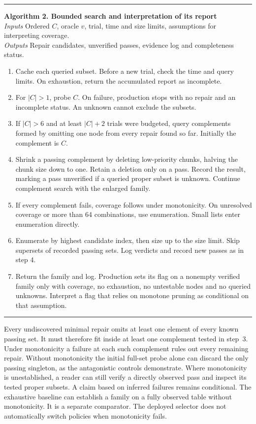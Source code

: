 \documentclass[11pt,letterpaper]{article}
\begin{document}
\begin{center}\begin{minipage}{.96\linewidth}\hrule\smallskip
\textbf{Algorithm 2. Bounded search and interpretation of its report}\\
\textit{Inputs} Ordered $C$, oracle $v$, trial, time and size limits, assumptions for interpreting coverage.\\
\textit{Outputs} Repair candidates, unverified passes, evidence log and completeness status.
\begin{enumerate}\setlength{\itemsep}{0pt}
\item Cache each queried subset. Before a new trial, check the time and query limits. On exhaustion, return the accumulated report as incomplete.
\item For $|C|>1$, probe $C$. On failure, production stops with no repair and an incomplete status. An unknown cannot exclude the subsets.
\item If $|C|>6$ and at least $|C|+2$ trials were budgeted, query complements formed by omitting one node from every repair found so far. Initially the complement is $C$.
\item Shrink a passing complement by deleting low-priority chunks, halving the chunk size down to one. Retain a deletion only on a pass. Record the result, marking a pass unverified if a queried proper subset is unknown. Continue complement search with the enlarged family.
\item If every complement fails, coverage follows under monotonicity. On unresolved coverage or more than 64 combinations, use enumeration. Small lists enter enumeration directly.
\item Enumerate by highest candidate index, then size up to the size limit. Skip supersets of recorded passing sets. Log verdicts and record new passes as in step 4.
\item Return the family and log. Production sets its flag on a nonempty verified family only with coverage, no exhaustion, no untestable nodes and no queried unknowns. Interpret a flag that relies on monotone pruning as conditional on that assumption.
\end{enumerate}\hrule\end{minipage}\end{center}

Every undiscovered minimal repair omits at least one element of every known passing set. It must therefore fit inside at least one complement tested in step~3. Under monotonicity a failure at each such complement rules out every remaining repair. Without monotonicity the initial full-set probe alone can discard the only passing singleton, as the antagonistic controls demonstrate. Where monotonicity is unestablished, a reader can still verify a directly observed pass and inspect its tested proper subsets. A claim based on inferred failures remains conditional. The exhaustive baseline can establish a family on a fully observed table without monotonicity. It is a separate comparator. The deployed selector does not automatically switch policies when monotonicity fails.
\end{document}
